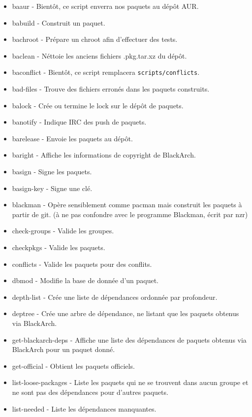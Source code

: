 \documentclass[a4paper, oneside, 11pt]{book}
\begin{document}
\begin{itemize}
\item baaur - Bient\^{o}t, ce script enverra nos paquets au d\'{e}p\^{o}t AUR.
\item babuild - Construit un paquet.
\item bachroot - Pr\'{e}pare un chroot afin d'effectuer des tests.
\item baclean - N\'{e}ttoie les anciens fichiers .pkg.tar.xz du d\'{e}p\^{o}t.
\item baconflict - Bient\^{o}t, ce script remplacera \verb|scripts/conflicts|.
\item bad-files - Trouve des fichiers erron\'{e}s dans les paquets construits.
\item balock - Cr\'{e}e ou termine le lock sur le d\'{e}p\^{o}t de paquets.
\item banotify - Indique IRC des push de paquets.
\item barelease - Envoie les paquets au d\'{e}p\^{o}t.
\item baright - Affiche les informations de copyright de BlackArch.
\item basign - Signe les paquets.
\item basign-key - Signe une cl\'{e}.
\item blackman - Op\`{e}re sensiblement comme pacman mais construit les paquets \`{a}
partir de git. (\`{a} ne pas confondre avec le programme Blackman, \'{e}crit par nzr)
\item check-groups - Valide les groupes.
\item checkpkgs - Valide les paquets.
\item conflicts - Valide les paquets pour des conflits.
\item dbmod - Modifie la base de donn\'{e}e d'un paquet.
\item depth-list - Cr\'{e}e une liste de d\'{e}pendances ordonn\'{e}e par profondeur.
\item deptree - Cr\'{e}e une arbre de d\'{e}pendance, ne listant que les paquets obtenus
via BlackArch.
\item get-blackarch-deps - Affiche une liste des d\'{e}pendances de paquets obtenus
via BlackArch pour un paquet donn\'{e}.
\item get-official - Obtient les paquets officiels.
\item list-loose-packages - Liste les paquets qui ne se trouvent dans aucun
groupe et ne sont pas des d\'{e}pendances pour d'autres paquets.
\item list-needed - Liste les d\'{e}pendances manquantes.

\end{itemize}
\end{document}
